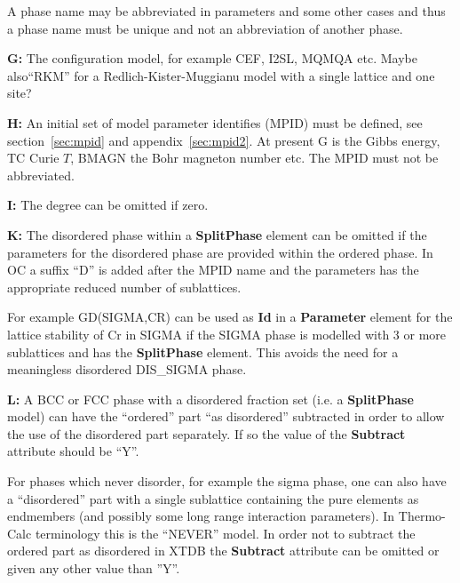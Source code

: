 \documentclass{article}
\begin{document}
\begin{description}
  A phase name may be abbreviated in parameters and some other cases
  and thus a phase name must be unique and not an abbreviation of
  another phase.

\item{\bf G:} The configuration model, for example CEF, I2SL, MQMQA
  etc.  Maybe also``RKM'' for a Redlich-Kister-Muggianu model with a
  single lattice and one site?

\item{\bf H:} An initial set of model parameter identifies (MPID) must
  be defined, see section~\ref{sec:mpid} and appendix~\ref{sec:mpid2}.
  At present G is the Gibbs energy, TC Curie $T$, BMAGN the Bohr
  magneton number etc.  The MPID must not be abbreviated.

\item{\bf I:} The degree can be omitted if zero.

\item{\bf K:} The disordered phase within a {\bf SplitPhase} element
  can be omitted if the parameters for the disordered phase are
  provided within the ordered phase.  In OC a suffix ``D'' is added
  after the MPID name and the parameters has the appropriate reduced
  number of sublattices.
  
  For example GD(SIGMA,CR) can be used as {\bf Id} in a {\bf
    Parameter} element for the lattice stability of Cr in SIGMA if the
  SIGMA phase is modelled with 3 or more sublattices and has the {\bf
    SplitPhase} element.  This avoids the need for a meaningless
  disordered DIS\_SIGMA phase.

\item{\bf L:} A BCC or FCC phase with a disordered fraction set (i.e.
  a {\bf SplitPhase} model) can have the ``ordered'' part ``as
  disordered'' subtracted in order to allow the use of the disordered
  part separately.  If so the value of the {\bf Subtract} attribute
  should be ``Y''.

  For phases which never disorder, for example the sigma phase, one
  can also have a ``disordered'' part with a single sublattice
  containing the pure elements as endmembers (and possibly some long
  range interaction parameters).  In Thermo-Calc terminology this is
  the ``NEVER'' model.  In order not to subtract the ordered part as
  disordered in XTDB the {\bf Subtract} attribute can be omitted or
  given any other value than ''Y''.

\end{description}

\end{document}
